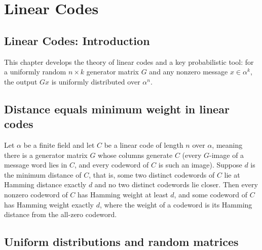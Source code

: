 \section{Linear Codes}
\subsection*{Linear Codes: Introduction}

This chapter develops the theory of linear codes and a key probabilistic tool:
for a uniformly random $n\times k$ generator matrix $G$ and any nonzero message
$x\in\alpha^k$, the output $Gx$ is uniformly distributed over $\alpha^n$.

\subsection{Distance equals minimum weight in linear codes}

\begin{theorem}
\label{ErrorCorrectingCodes.Codeword.Linear_Code_dist_eq_min_weight}
\leanok
{}
Let $\alpha$ be a finite field and let $C$ be a linear code of length $n$ over $\alpha$,
meaning there is a generator matrix $G$ whose columns generate $C$ (every $G$-image of a
message word lies in $C$, and every codeword of $C$ is such an image). Suppose $d$ is
the minimum distance of $C$, that is, some two distinct codewords of $C$ lie at Hamming
distance exactly $d$ and no two distinct codewords lie closer. Then every nonzero
codeword of $C$ has Hamming weight at least $d$, and some codeword of $C$ has Hamming
weight exactly $d$, where the weight of a codeword is its Hamming distance from the
all-zero codeword.
\end{theorem}

\subsection{Uniform distributions and random matrices}

